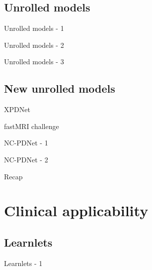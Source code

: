 \documentclass[aspectratio=169,xcolor=dvipsnames]{beamer}
\begin{document}
\subsection{Unrolled models}
\begin{frame}{Unrolled models - 1}
\end{frame}

\begin{frame}{Unrolled models - 2}
\end{frame}

\begin{frame}{Unrolled models - 3}

\end{frame}

\subsection{New unrolled models}
\begin{frame}{XPDNet}
\end{frame}

\begin{frame}{fastMRI challenge}
\end{frame}

\begin{frame}{NC-PDNet - 1}
\end{frame}

\begin{frame}{NC-PDNet - 2}
\end{frame}

\begin{frame}{Recap}
\end{frame}

\section{Clinical applicability}
\subsection{Learnlets}
\begin{frame}{Learnlets - 1}
\end{frame}
\end{document}
